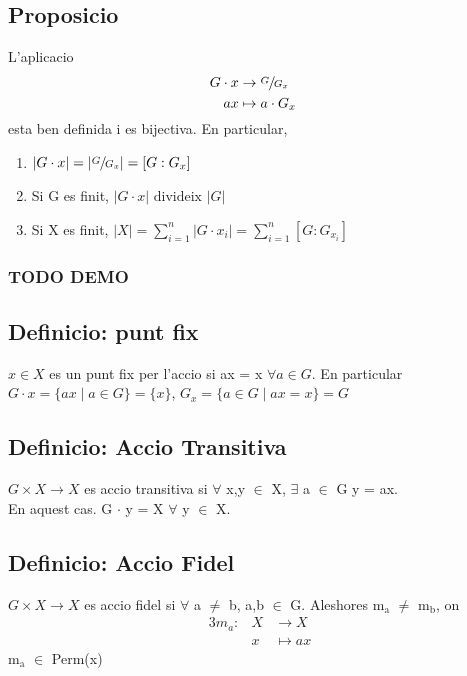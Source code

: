 \documentclass[11pt]{article}
\begin{document}
\subsection{Proposicio}
\label{sec:orga38ccb3}
L'aplicacio 
\begin{alignat*}{3}
G \cdot x &\to \sfrac{G}{G_x}& \\
ax &\mapsto a\cdot G_x&
\end{alignat*}
esta ben definida i es bijectiva. En particular, \\
\begin{enumerate}
\item \(\vert G \cdot x \vert = \vert \sfrac{G}{G_x}\vert = [G:G_x]\)
\item Si G es finit, \(\vert G \cdot x \vert \text{ divideix } \vert G \vert\)
\item Si X es finit, \(\vert X \vert = \sum_{i=1}^{n} \vert G \cdot x_i \vert = \sum_{i=1}^n [G:G_{x_i}]\)
\end{enumerate}
\subsubsection{{\bfseries\sffamily TODO} DEMO}
\label{sec:org2c9edef}

\subsection{Definicio: punt fix}
\label{sec:orgebce142}
\(x \in X\) es un punt fix per l'accio si ax = x \(\forall a \in G\). En particular\\
\(G \cdot x = \{ax \mid a \in G\} = \{x\}\), \(G_x = \{ a \in G \mid ax = x \} = G\)

\subsection{Definicio: Accio Transitiva}
\label{sec:orgcf52ffb}
\(G \times X \to X\) es accio transitiva si \(\forall\) x,y \(\in\) X, \(\exists\) a \(\in\) G  y = ax. \\
En aquest cas. G \(\cdot\) y = X \(\forall\) \quad y \(\in\) X.

\subsection{Definicio: Accio Fidel}
\label{sec:org55c0ca4}
\(G \times X \to X\) es accio fidel si \(\forall\) a \(\neq\) b, a,b \(\in\) G. Aleshores m\(_{\text{a}}\) \(\neq\) m\(_{\text{b}}\), on
\begin{alignat*}{3}
m_a: &X &\to X \\
&x &\mapsto ax
\end{alignat*}
m\(_{\text{a}}\) \(\in\) Perm(x)
\end{document}
